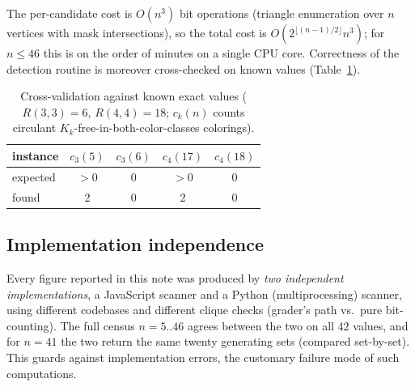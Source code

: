 \documentclass[11pt]{article}
\theoremstyle{remark}
\begin{document}
\begin{center}
\end{center}

The per-candidate cost is $O(n^3)$ bit operations (triangle enumeration over $n$ vertices
with mask intersections), so the total cost is
$O\!\left(2^{\lfloor(n-1)/2\rfloor} n^3\right)$; for $n\le46$ this is on the order of
minutes on a single CPU core. Correctness of the detection routine is moreover
cross-checked on known values (Table~\ref{tab:cal}).

\begin{table}[ht]
\centering
\caption{Cross-validation against known exact values ($R(3,3)=6$, $R(4,4)=18$;
$c_k(n)$ counts circulant $K_k$-free-in-both-color-classes colorings).}
\label{tab:cal}
\begin{tabular}{lcccc}
\toprule
instance & $c_3(5)$ & $c_3(6)$ & $c_4(17)$ & $c_4(18)$\\
\midrule
expected & $>0$ & $0$ & $>0$ & $0$\\
found & 2 & 0 & 2 & 0\\
\bottomrule
\end{tabular}
\end{table}

\subsection{Implementation independence}\label{sec:implind}
Every figure reported in this note was produced by \emph{two independent implementations},
a JavaScript scanner and a Python (multiprocessing) scanner, using different codebases and
different clique checks (grader's path vs.\ pure bit-counting). The full census
$n=5..46$ agrees between the two on all $42$ values, and for $n=41$ the two return the
same twenty generating sets (compared set-by-set). This guards against implementation
errors, the customary failure mode of such computations.
\end{document}
